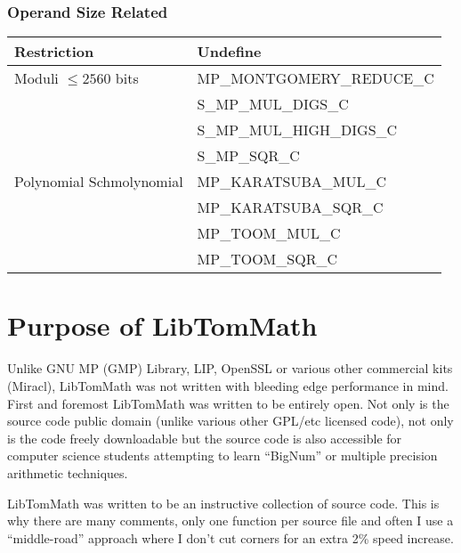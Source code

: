 \documentclass[synpaper]{book}
\begin{document}
\subsubsection{Operand Size Related}
\begin{small}
  \begin{center}
    \begin{tabular}{|l|l|}
      \hline \textbf{Restriction}     & \textbf{Undefine}         \\
      \hline Moduli $\le 2560$ bits   & MP\_MONTGOMERY\_REDUCE\_C \\
                                      & S\_MP\_MUL\_DIGS\_C       \\
                                      & S\_MP\_MUL\_HIGH\_DIGS\_C \\
                                      & S\_MP\_SQR\_C             \\
      \hline Polynomial Schmolynomial & MP\_KARATSUBA\_MUL\_C     \\
                                      & MP\_KARATSUBA\_SQR\_C     \\
                                      & MP\_TOOM\_MUL\_C          \\
                                      & MP\_TOOM\_SQR\_C          \\

      \hline
    \end{tabular}
  \end{center}
\end{small}

\section{Purpose of LibTomMath}
Unlike	GNU MP (GMP) Library, LIP, OpenSSL or various other commercial kits (Miracl), LibTomMath
was not written with bleeding edge performance in mind.  First and foremost LibTomMath was written
to be entirely open. Not only is the source code public domain (unlike various other GPL/etc
licensed code), not only is the code freely downloadable but the source code is also accessible for
computer science students attempting to learn ``BigNum'' or multiple precision arithmetic
techniques.

LibTomMath was written to be an instructive collection of source code.	This is why there are many
comments, only one function per source file and often I use a ``middle-road'' approach where I
don't cut corners for an extra 2\% speed increase.
\end{document}
